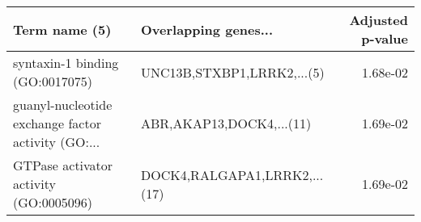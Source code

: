 \begin{tabular}{llr}
\toprule
                                     Term name (5) &         Overlapping genes... &  Adjusted p-value \\
\midrule
                   syntaxin-1 binding (GO:0017075) &   UNC13B,STXBP1,LRRK2,...(5) &          1.68e-02 \\
guanyl-nucleotide exchange factor activity (GO:... &     ABR,AKAP13,DOCK4,...(11) &          1.69e-02 \\
            GTPase activator activity (GO:0005096) & DOCK4,RALGAPA1,LRRK2,...(17) &          1.69e-02 \\
\bottomrule
\end{tabular}
